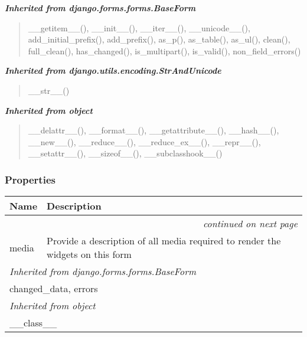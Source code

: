 \large{\textbf{\textit{Inherited from django.forms.forms.BaseForm}}}

\begin{quote}
\_\_getitem\_\_(), \_\_init\_\_(), \_\_iter\_\_(), \_\_unicode\_\_(), add\_initial\_prefix(), add\_prefix(), as\_p(), as\_table(), as\_ul(), clean(), full\_clean(), has\_changed(), is\_multipart(), is\_valid(), non\_field\_errors()
\end{quote}

\large{\textbf{\textit{Inherited from django.utils.encoding.StrAndUnicode}}}

\begin{quote}
\_\_str\_\_()
\end{quote}

\large{\textbf{\textit{Inherited from object}}}

\begin{quote}
\_\_delattr\_\_(), \_\_format\_\_(), \_\_getattribute\_\_(), \_\_hash\_\_(), \_\_new\_\_(), \_\_reduce\_\_(), \_\_reduce\_ex\_\_(), \_\_repr\_\_(), \_\_setattr\_\_(), \_\_sizeof\_\_(), \_\_subclasshook\_\_()
\end{quote}


  \subsubsection{Properties}

    \vspace{-1cm}
\hspace{\varindent}\begin{longtable}{|p{\varnamewidth}|p{\vardescrwidth}|l}
\cline{1-2}
\cline{1-2} \centering \textbf{Name} & \centering \textbf{Description}& \\
\cline{1-2}
\endhead\cline{1-2}\multicolumn{3}{r}{\small\textit{continued on next page}}\\\endfoot\cline{1-2}
\endlastfoot\raggedright m\-e\-d\-i\-a\- & \raggedright Provide a description of all media required to render the widgets
          on this form&\\
\cline{1-2}
\multicolumn{2}{|l|}{\textit{Inherited from django.forms.forms.BaseForm}}\\
\multicolumn{2}{|p{\varwidth}|}{\raggedright changed\_data, errors}\\
\cline{1-2}
\multicolumn{2}{|l|}{\textit{Inherited from object}}\\
\multicolumn{2}{|p{\varwidth}|}{\raggedright \_\_class\_\_}\\
\cline{1-2}
\end{longtable}


